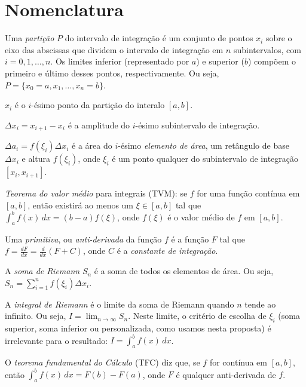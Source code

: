 \documentclass[a4paper,12pt]{scrartcl}
\begin{document}
  \section*{Nomenclatura}
    \begin{compactitem}
      \item Uma \emph{partição} $P$ do intervalo de integração é um conjunto de pontos $x_i$ sobre o eixo das abscissas que dividem o intervalo de integração em $n$ subintervalos, com $i = 0, 1, \ldots, n$. Os limites inferior (representado por $a$) e superior ($b$) compõem o primeiro e último desses pontos, respectivamente. Ou seja, $P = \{x_0 = a, x_1, \ldots, x_n = b\}$.
      
      \item $x_i$ é o $i$-ésimo ponto da partição do interalo $[a,b]$.
      
      \item $\Delta x_i = x_{i+1} - x_i$ é a amplitude do $i$-ésimo subintervalo de integração.
      
      \item $\Delta a_i = f(\xi_i) \Delta x_i$ é a área do $i$-ésimo \emph{elemento de área}, um retângulo de base $\Delta x_i$ e altura $f(\xi_i)$, onde $\xi_i$ é um ponto qualquer do subintervalo de integração $[x_i, x_{i + 1}]$.

      \item \emph{Teorema do valor médio} para integrais (TVM): se $f$ for uma função contínua em $[a,b]$, então existirá ao menos um $\xi \in [a,b]$ tal que $\int_a^b f(x)\,dx = (b-a) f(\xi)$, onde $f(\xi)$ é o valor médio de $f$ em $[a,b]$.

      \item Uma \emph{primitiva}, ou \emph{anti-derivada} da função $f$ é a função $F$ tal que $f = \frac{dF}{dx} = \frac{d}{dx}\left(F + C\right)$, onde $C$ é a \emph{constante de integração}.

      \item A \emph{soma de Riemann} $S_n$ é a soma de todos os elementos de área. Ou seja, $S_n = \sum_{i=1}^{n} f(\xi_i) \Delta x_i$.

      \item A \emph{integral de Riemann} é o limite da soma de Riemann quando $n$ tende ao infinito. Ou seja, $I = \lim_{n \to \infty} S_n$. Neste limite, o critério de escolha de $\xi_i$ (soma superior, soma inferior ou personalizada, como usamos nesta proposta) é irrelevante para o resultado: $I = \int_a^b f(x)\, dx$.

      \item O \emph{teorema fundamental do Cálculo} (TFC) diz que, se $f$ for contínua em $[a,b]$, então $\int_a^b f(x)\,dx = F(b) - F(a)$, onde $F$ é qualquer anti-derivada de $f$.
    \end{compactitem}
\end{document}

